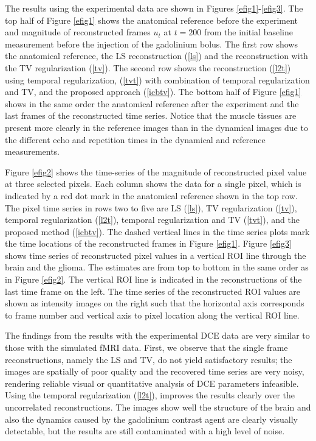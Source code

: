 The results using the experimental data are shown in Figures \ref{efig1}-\ref{efig3}. The top half of Figure \ref{efig1} shows the anatomical reference before the experiment and magnitude of reconstructed frames $u_t$ at $t=200$ from the initial baseline measurement before the injection of the gadolinium bolus. 
The first row shows the anatomical reference, the LS reconstruction (\ref{ls}) and the reconstruction with the TV regularization (\ref{tv}). 
The second row shows the reconstruction (\ref{l2t}) using temporal regularization, (\ref{tvt}) with combination of temporal regularization and TV, and the proposed approach (\ref{icbtv}). 
The bottom half of Figure \ref{efig1} shows in the same order the anatomical reference after the experiment and the last frames of the reconstructed time series.    
Notice that the muscle tissues are present more clearly in the reference images than in the dynamical images due to the different echo and repetition times in the dynamical and reference measurements. 

Figure \ref{efig2} shows the time-series of the magnitude of reconstructed pixel value at three selected pixels. Each column shows the data for a single pixel, which is indicated by a red dot mark in the anatomical reference shown in the top row. 
The pixel time series in rows two to five are LS (\ref{ls}), TV regularization (\ref{tv}), temporal regularization (\ref{l2t}), temporal regularization and TV (\ref{tvt}), and the proposed method (\ref{icbtv}).  
The dashed vertical lines in the time series plots mark the time locations of the reconstructed frames in Figure \ref{efig1}.
Figure \ref{efig3} shows time series of reconstructed pixel values in a vertical ROI 
line through the brain and the glioma.
The estimates are from top to bottom in the same order as in Figure \ref{efig2}.
The vertical ROI line is indicated in the reconstructions
of the last time frame on the left.
The time series of the reconstructed ROI values are shown as intensity images on the right such that the horizontal axis corresponds to frame number and vertical axis to pixel location along the vertical ROI line.

The findings from the results with the experimental DCE data are very similar to those with the simulated fMRI data. First, we observe that the single frame reconstructions, namely the LS and TV, do not yield satisfactory results; the images are spatially of poor quality and the recovered time series are very noisy, rendering reliable visual or quantitative analysis of DCE parameters infeasible.
Using the temporal regularization (\ref{l2t}), improves the results clearly over the uncorrelated reconstructions. 
The images show well the structure of the brain and also the dynamics caused by the gadolinium contrast agent are clearly visually detectable, but the results are still contaminated with a high level of noise. 

